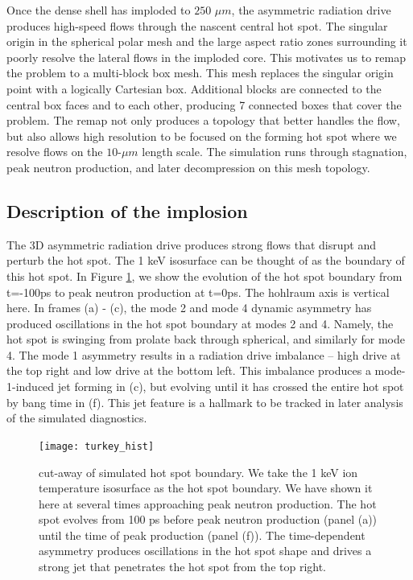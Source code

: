 \documentclass[aip,pop,numerical,reprint,floatfix]{revtex4-1}
\begin{document}
Once the dense shell has imploded to $250$ $\mu m$, the asymmetric
radiation drive produces high-speed flows through the nascent central
hot spot. The singular origin in the spherical polar mesh and the
large aspect ratio zones surrounding it poorly resolve the lateral
flows in the imploded core. This motivates us to remap the problem
to a multi-block box mesh. This mesh replaces the
singular origin point with a logically Cartesian box. Additional blocks
are connected to the central box faces and to each other, producing
7 connected boxes that cover the problem. The remap not only produces
a topology that better handles the flow, but also allows high resolution
to be focused on the forming hot spot where we resolve flows on the
$10$-$\mu m$ length scale. The simulation runs through stagnation,
peak neutron production, and later decompression on this mesh topology.

\subsection{\label{sec:implosion}Description of the implosion}

The 3D asymmetric radiation drive produces strong flows that disrupt
and perturb the hot spot. The 1 keV isosurface can be thought of as
the boundary of this hot spot. In Figure \ref{fig:3d_hist}, we show the
evolution of the hot spot boundary from t=-100ps to peak neutron production
at t=0ps. The hohlraum axis is vertical here. In frames (a) - (c),
the mode 2 and mode 4 dynamic asymmetry has produced oscillations
in the hot spot boundary at modes 2 and 4. Namely, the hot spot is
swinging from prolate back through spherical, and similarly for mode
4. The mode 1 asymmetry results in a radiation drive imbalance --
high drive at the top right and low drive at the bottom left. This
imbalance produces a mode-1-induced jet \cite{spears_mode1_pop_140409}
forming in (c), but evolving until it has crossed the entire hot spot
by bang time in (f). This jet feature is a hallmark to be tracked
in later analysis of the simulated diagnostics.

\begin{figure}[htb]
\centering
\texttt{[image: turkey\_hist]}
\caption{\label{fig:3d_hist}cut-away of simulated hot spot boundary.  We take the 1 keV ion temperature isosurface as the hot spot boundary.  We have shown it here at several times approaching peak neutron production. The hot spot evolves from 100 ps before peak neutron production (panel (a)) until the time of peak production (panel (f)). The time-dependent asymmetry produces oscillations in the hot spot shape and drives a strong jet that penetrates the hot spot from the top right.}
\end{figure}
\end{document}
